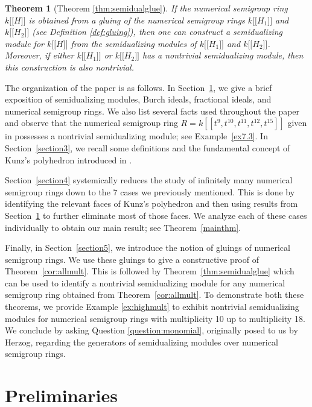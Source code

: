 \documentclass{amsart}
\newcommand{\ldb}{\mathopen{[\![}} %
\newcommand{\rdb}{\mathclose{]\!]}} %
\theoremstyle{plain}
\newtheorem{theorem}{Theorem}
\theoremstyle{definition}
\numberwithin{theorem}{section}
\numberwithin{equation}{section}
\numberwithin{equation}{theorem}
\begin{document}
\begin{theorem}[{Theorem \ref{thm:semidualglue}}]
If the numerical semigroup ring $k \ldb H \rdb$ is obtained from a gluing of the numerical semigroup rings $k \ldb H_1 \rdb$ and $k \ldb H_2 \rdb$ (see Definition \ref{def:gluing}), then one can construct a semidualizing module for $k \ldb H \rdb$ from the semidualizing modules of $k \ldb H_1 \rdb$ and $k \ldb H_2 \rdb$. Moreover, if either $k \ldb H_1 \rdb$ or $k \ldb H_2 \rdb$ has a nontrivial semidualizing module, then this construction is also nontrivial.
\end{theorem}

The organization of the paper is as follows. In Section~\ref{prelim}, we give a brief exposition of semidualizing modules, Burch ideals, fractional ideals, and numerical semigroup rings.
We also list several facts used throughout the paper and observe that the numerical semigroup ring $R=k[\![ t^9, t^{10}, t^{11}, t^{12}, t^{15} ]\!]$ given in \cite[Example 7.3]{GTTT} possesses a nontrivial semidualizing module; see Example~\ref{ex7.3}. In Section~\ref{section3}, we recall some definitions and the fundamental concept of Kunz's polyhedron introduced in \cite{K}. 

Section~\ref{section4} systemically reduces the study of infinitely many numerical semigroup rings down to the 7 cases we previously mentioned. This is done by identifying the relevant faces of Kunz’s polyhedron and then using results from Section~\ref{prelim} to further eliminate most of those faces. We analyze each of these cases individually to obtain our main result; see Theorem~\ref{mainthm}.

Finally, in Section~\ref{section5}, we introduce the notion of gluings of numerical semigroup rings. We use these gluings to give a constructive proof of Theorem~\ref{cor:allmult}. This is followed by Theorem~\ref{thm:semidualglue} which can be used to identify a nontrivial semidualizing module for any numerical semigroup ring obtained from Theorem~\ref{cor:allmult}. To demonstrate both these theorems, we provide Example \ref{ex:highmult} to exhibit nontrivial semidualizing modules for numerical semigroup rings with multiplicity 10 up to multiplicity 18. We conclude by asking Question \ref{question:monomial}, originally posed to us by Herzog, regarding the generators of semidualizing modules over numerical semigroup rings.


\section{Preliminaries} \label{prelim}
\end{document}
